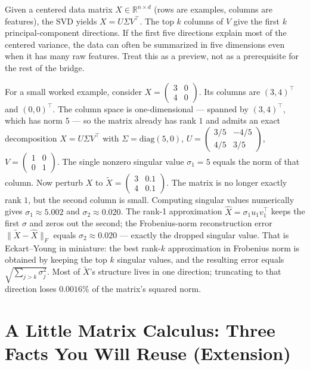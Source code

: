 Given a centered data matrix $X \in \mathbb{R}^{n \times d}$ (rows are examples, columns are features), the SVD yields $X = U \Sigma V^\top$. The top \(k\) columns of \(V\) give the first \(k\) principal-component directions. If the first five directions explain most of the centered variance, the data can often be summarized in five dimensions even when it has many raw features. Treat this as a preview, not as a prerequisite for the rest of the bridge.

For a small worked example, consider $X = \begin{pmatrix} 3 & 0 \\ 4 & 0 \end{pmatrix}$. Its columns are $(3, 4)^\top$ and $(0, 0)^\top$. The column space is one-dimensional --- spanned by $(3, 4)^\top$, which has norm $5$ --- so the matrix already has rank $1$ and admits an exact decomposition $X = U \Sigma V^\top$ with $\Sigma = \mathrm{diag}(5, 0)$, $U = \begin{pmatrix} 3/5 & -4/5 \\ 4/5 & 3/5 \end{pmatrix}$, $V = \begin{pmatrix} 1 & 0 \\ 0 & 1 \end{pmatrix}$. The single nonzero singular value $\sigma_1 = 5$ equals the norm of that column. Now perturb $X$ to $\tilde X = \begin{pmatrix} 3 & 0.1 \\ 4 & 0.1 \end{pmatrix}$. The matrix is no longer exactly rank $1$, but the second column is small. Computing singular values numerically gives $\sigma_1 \approx 5.002$ and $\sigma_2 \approx 0.020$. The rank-1 approximation $\hat X = \sigma_1 u_1 v_1^\top$ keeps the first $\sigma$ and zeros out the second; the Frobenius-norm reconstruction error $\|\tilde X - \hat X\|_F$ equals $\sigma_2 \approx 0.020$ --- exactly the dropped singular value. That is Eckart--Young in miniature: the best rank-$k$ approximation in Frobenius norm is obtained by keeping the top $k$ singular values, and the resulting error equals $\sqrt{\sum_{j > k} \sigma_j^2}$. Most of $\tilde X$'s structure lives in one direction; truncating to that direction loses $0.0016\%$ of the matrix's squared norm.

\section*{A Little Matrix Calculus: Three Facts You Will Reuse (Extension)}

